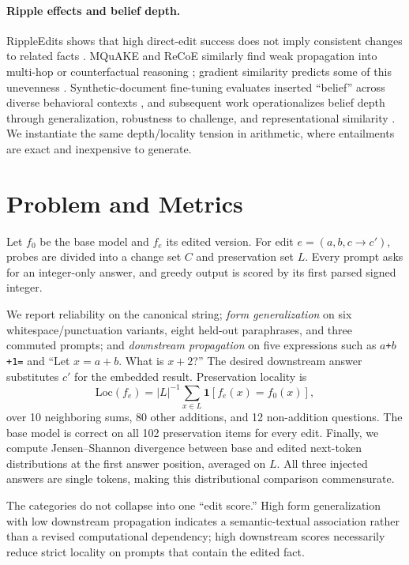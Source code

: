 \documentclass[10pt,twocolumn]{article}
\begin{document}
\paragraph{Ripple effects and belief depth.}
RippleEdits shows that high direct-edit success does not imply consistent changes to related facts \citep{cohen2024ripple}.  MQuAKE and ReCoE similarly find weak propagation into multi-hop or counterfactual reasoning \citep{zhong2023mquake,hua2024propagation}; gradient similarity predicts some of this unevenness \citep{qin2024messy}.  Synthetic-document fine-tuning evaluates inserted ``belief'' across diverse behavioral contexts \citep{wang2025sdf}, and subsequent work operationalizes belief depth through generalization, robustness to challenge, and representational similarity \citep{slocum2025believe}.  We instantiate the same depth/locality tension in arithmetic, where entailments are exact and inexpensive to generate.

\section{Problem and Metrics}
Let $f_0$ be the base model and $f_e$ its edited version.  For edit $e=(a,b,c\rightarrow c')$, probes are divided into a change set $C$ and preservation set $L$.  Every prompt asks for an integer-only answer, and greedy output is scored by its first parsed signed integer.

We report reliability on the canonical string; \emph{form generalization} on six whitespace/punctuation variants, eight held-out paraphrases, and three commuted prompts; and \emph{downstream propagation} on five expressions such as \texttt{$a$+$b$+1=} and ``Let $x=a+b$. What is $x+2$?''  The desired downstream answer substitutes $c'$ for the embedded result.  Preservation locality is
\begin{equation}
  \mathrm{Loc}(f_e)=|L|^{-1}\sum_{x\in L}\mathbf{1}[f_e(x)=f_0(x)],
\end{equation}
over 10 neighboring sums, 80 other additions, and 12 non-addition questions.  The base model is correct on all 102 preservation items for every edit.  Finally, we compute Jensen--Shannon divergence between base and edited next-token distributions at the first answer position, averaged on $L$.  All three injected answers are single tokens, making this distributional comparison commensurate.

The categories do not collapse into one ``edit score.''  High form generalization with low downstream propagation indicates a semantic-textual association rather than a revised computational dependency; high downstream scores necessarily reduce strict locality on prompts that contain the edited fact.
\end{document}
